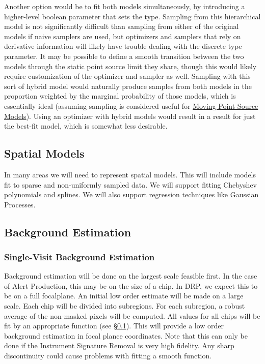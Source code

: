 Another option would be to fit both models simultaneously, by introducing a higher-level boolean parameter that sets the type.  Sampling from this hierarchical model is not significantly difficult than sampling from either of the original models if naive samplers are used, but optimizers and samplers that rely on derivative information will likely have trouble dealing with the discrete type parameter.  It may be possible to define a smooth transition between the two models through the static point source limit they share, though this would likely require customization of the optimizer and sampler as well.  Sampling with this sort of hybrid model would naturally produce samples from both models in the proportion weighted by the marginal probability of those models, which is essentially ideal (assuming sampling is considered useful for \hyperref[sec:acMovingPointSourceModels]{Moving Point Source Models}).  Using an optimizer with hybrid models would result in a result for just the best-fit model, which is somewhat less desirable.

\subsection{Spatial Models}
\label{sec:acSpatialModels}
In many areas we will need to represent spatial models.  This will include models fit to sparse and non-uniformly sampled data.  We will support fitting Chebyshev polynomials and splines.  We will also support regression techniques like Gaussian Processes.

\subsection{Background Estimation}
\label{sec:acBackgroundEstimation}

\subsubsection{Single-Visit Background Estimation}
\label{sec:acSingleVisitBackgroundEstimation}

Background estimation will be done on the largest scale feasible first.  In the case of Alert Production, this may be on the size of a chip.  In DRP, we expect this to be on a full focalplane.  An initial low order estimate will be made on a large scale.  Each chip will be divided into subregions.  For each subregion, a robust average of the non-masked pixels will be computed.  All values for all chips will be fit by an appropriate function (see \S \ref{sec:acSpatialModels}).  This will provide a low order background estimation in focal plance coordinates.  Note that this can only be done if the Instrument Signature Removal is very high fidelity.  Any sharp discontinuity could cause problems with fitting a smooth function.

